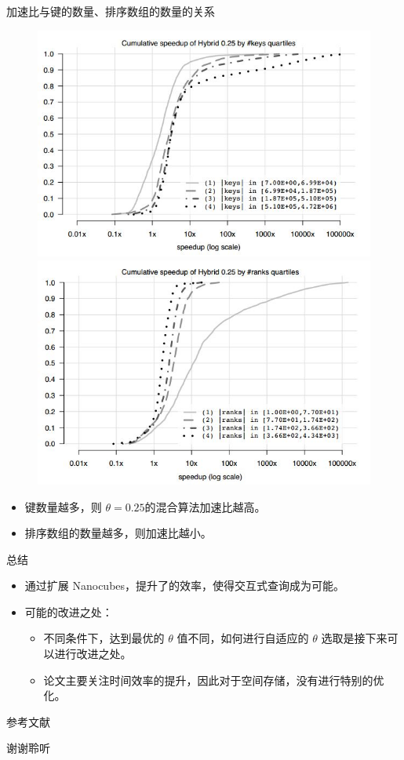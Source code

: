 \documentclass[10pt,aspectratio=169]{ctexbeamer}
\begin{document}
\begin{frame}{加速比与键的数量、排序数组的数量的关系}
    \begin{figure}
        \includegraphics[width=.4\textwidth]{pic/speedup-keys.jpg}
        \includegraphics[width=.4\textwidth]{pic/speedup-ranks.jpg}
    \end{figure}
    \begin{itemize}
        \item 键数量越多，则 $\theta = 0.25$的混合算法加速比越高。
        \item 排序数组的数量越多，则加速比越小。
    \end{itemize}
\end{frame}

\begin{frame}{总结}
    \begin{itemize}[<+->]
        \item 通过扩展 Nanocubes，提升了的效率，使得交互式查询成为可能。
        \item 可能的改进之处：
              \begin{itemize}
                  \item 不同条件下，达到最优的 $\theta$ 值不同，如何进行自适应的 $\theta$ 选取是接下来可以进行改进之处。
                  \item 论文主要关注时间效率的提升，因此对于空间存储，没有进行特别的优化。
              \end{itemize}
    \end{itemize}

\end{frame}

\begin{frame}{参考文献}
    \printbibliography
\end{frame}

\begin{frame}
    \begin{center}
        \Huge
        谢谢聆听
    \end{center}
\end{frame}
\end{document}
